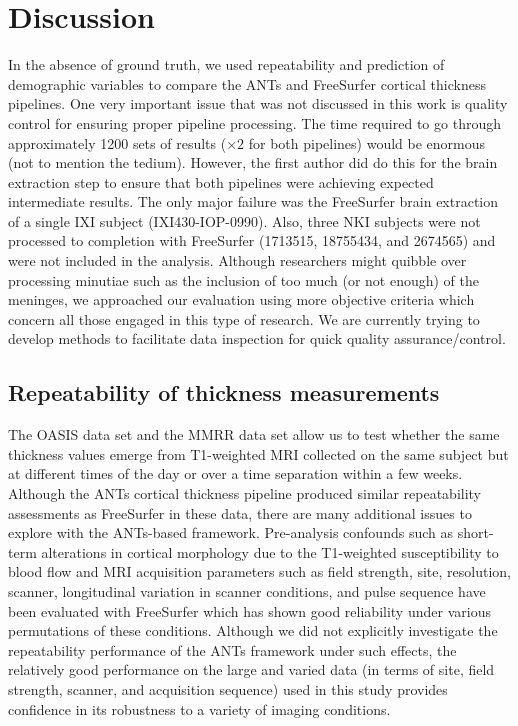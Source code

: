 \section{Discussion}
In the absence of ground truth, we used repeatability and prediction of
demographic variables to compare the ANTs and FreeSurfer cortical 
thickness pipelines.  One very important
issue that was not discussed in this work is quality control for
ensuring proper pipeline processing.  The time required to go through 
approximately 1200 sets of results ($\times 2$ for both pipelines) would be
enormous (not to mention the tedium).  However, the first
author did do this for the brain extraction step to ensure that both pipelines
were achieving expected intermediate results.  The only
major failure was the FreeSurfer brain extraction of
a single IXI subject (IXI430-IOP-0990).
Also, three NKI subjects were not processed to completion
with FreeSurfer (1713515, 18755434, and 2674565) and were not included in the analysis.
Although  researchers might quibble over processing minutiae such as the
inclusion of too much (or not enough) of the meninges, we approached
our evaluation using more objective criteria which concern all those
engaged in this type of research.  We are currently trying to develop methods
to facilitate data inspection for quick quality assurance/control.


\subsection{Repeatability of thickness measurements}
The OASIS data set and the MMRR data set allow us to test 
whether the same thickness values emerge from T1-weighted
MRI collected on the same subject but at different times of
the day or over a time separation within a few weeks.  
Although the ANTs cortical thickness pipeline produced similar
repeatability assessments as FreeSurfer in these data, there
are many additional issues to explore with the ANTs-based
framework.  Pre-analysis confounds such as short-term alterations in cortical 
morphology due to the T1-weighted susceptibility to blood flow 
\cite{Franklin2013,Salgado-Pineda2006,Yamasue2007} and
MRI acquisition parameters such as field strength, site, resolution, 
scanner, longitudinal variation in scanner conditions, and pulse sequence \citep{han2006,lusebrink2013,jovicich2013} have been evaluated
with FreeSurfer which has shown good reliability
under various permutations of these conditions.  
Although we did not explicitly investigate the repeatability performance of the 
ANTs framework under such effects, the relatively good performance
on the large and varied data (in terms of site, field strength, scanner,
and acquisition sequence) used in this study provides confidence in 
its robustness to a variety of imaging conditions.

